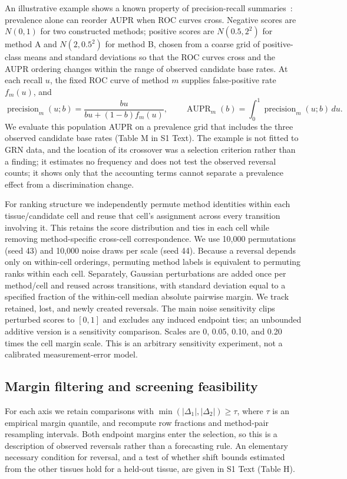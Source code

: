 \documentclass[10pt,letterpaper]{article}
\begin{document}
An illustrative example shows a known property of precision-recall summaries~\cite{davis2006relationship,saito2015precision,boyd2013aucpr}: prevalence alone can reorder AUPR when ROC curves cross. Negative scores are $N(0,1)$ for two constructed methods; positive scores are $N(0.5,2^2)$ for method A and $N(2,0.5^2)$ for method B, chosen from a coarse grid of positive-class means and standard deviations so that the ROC curves cross and the AUPR ordering changes within the range of observed candidate base rates. At each recall $u$, the fixed ROC curve of method $m$ supplies false-positive rate $f_m(u)$, and
\begin{equation}
\operatorname{precision}_m(u;b)=\frac{bu}{bu+(1-b)f_m(u)},\qquad
\operatorname{AUPR}_m(b)=\int_0^1\operatorname{precision}_m(u;b)\,du.
\end{equation}
We evaluate this population AUPR on a prevalence grid that includes the three observed candidate base rates (Table M in S1 Text). The example is not fitted to GRN data, and the location of its crossover was a selection criterion rather than a finding; it estimates no frequency and does not test the observed reversal counts; it shows only that the accounting terms cannot separate a prevalence effect from a discrimination change.

For ranking structure we independently permute method identities within each tissue/candidate cell and reuse that cell's assignment across every transition involving it. This retains the score distribution and ties in each cell while removing method-specific cross-cell correspondence. We use 10{,}000 permutations (seed 43) and 10{,}000 noise draws per scale (seed 44). Because a reversal depends only on within-cell orderings, permuting method labels is equivalent to permuting ranks within each cell. Separately, Gaussian perturbations are added once per method/cell and reused across transitions, with standard deviation equal to a specified fraction of the within-cell median absolute pairwise margin. We track retained, lost, and newly created reversals. The main noise sensitivity clips perturbed scores to $[0,1]$ and excludes any induced endpoint ties; an unbounded additive version is a sensitivity comparison. Scales are 0, 0.05, 0.10, and 0.20 times the cell margin scale. This is an arbitrary sensitivity experiment, not a calibrated measurement-error model.

\subsection*{Margin filtering and screening feasibility}
For each axis we retain comparisons with $\min(|\Delta_1|,|\Delta_2|)\ge\tau$, where $\tau$ is an empirical margin quantile, and recompute row fractions and method-pair resampling intervals. Both endpoint margins enter the selection, so this is a description of observed reversals rather than a forecasting rule. An elementary necessary condition for reversal, and a test of whether shift bounds estimated from the other tissues hold for a held-out tissue, are given in S1 Text (Table H).
\end{document}
